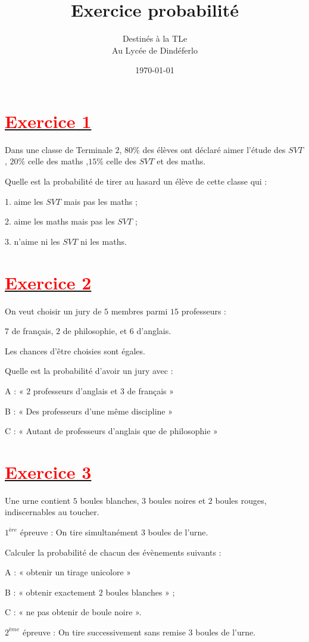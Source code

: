 \documentclass[12pt]{article}
\author{Destinés à la TLe\\Au Lycée de Dindéferlo}
\title{\textbf{Exercice probabilité }}
\date{\today}
\begin{document}
\maketitle
\newpage
\section*{\underline{\textbf{\textcolor{red}{Exercice 1}}}}
Dans une classe de Terminale $2$, $80\%$ des élèves ont déclaré aimer l'étude des $SVT$, $20\%$ celle des maths ,$15\%$ celle des $SVT$ et des maths.

Quelle est la probabilité de tirer au hasard un élève de cette classe qui :

1. aime les $SVT$ mais pas les maths ;

2. aime les maths mais pas les $SVT$ ;

3. n'aime ni les $SVT$ ni les maths.
\section*{\underline{\textbf{\textcolor{red}{Exercice 2}}}}
On veut choisir un jury de $5$ membres parmi $15$ professeurs :

$7$ de français, $2$ de philosophie, et $6$ d'anglais.

Les chances d'être choisies sont égales.

Quelle est la probabilité d'avoir un jury avec :

A : « $2$ professeurs d'anglais et $3$ de français »

B : « Des professeurs d'une même discipline »

C : « Autant de professeurs d'anglais que de philosophie »
\section*{\underline{\textbf{\textcolor{red}{Exercice 3}}}}
Une urne contient $5$ boules blanches, $3$ boules noires et $2$ boules rouges, indiscernables au toucher.

$1^{ère}$ épreuve : On tire simultanément $3$ boules de l'urne.


Calculer la probabilité de chacun des évènements suivants :

A : « obtenir un tirage unicolore »

B : « obtenir exactement $2$ boules blanches » ;

C : « ne pas obtenir de boule noire ».

$2^{ème}$ épreuve : On tire successivement sans remise $3$ boules de l'urne.
\end{document}
